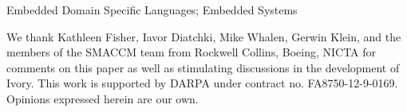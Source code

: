 \documentclass{sigplanconf}
\begin{document}
\keywords
Embedded Domain Specific Languages; Embedded Systems


















\acks

We thank Kathleen Fisher, Iavor Diatchki, Mike Whalen, Gerwin Klein, and the
members of the SMACCM team from Rockwell Collins, Boeing, NICTA for comments on
this paper as well as stimulating discussions in the development of Ivory.  This
work is supported by DARPA under contract no. FA8750-12-9-0169.  Opinions
expressed herein are our own.





\appendix
\clearpage





\end{document}
